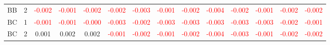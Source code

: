 \begin{table}[!htb]
{\begin{tabular}{llcccccccccccc}
BB & 2 & \textcolor{red}{-0.002} & \textcolor{red}{-0.001} & \textcolor{red}{-0.002} & \textcolor{red}{-0.002} & \textcolor{red}{-0.003} & \textcolor{red}{-0.001} & \textcolor{red}{-0.002} & \textcolor{red}{-0.004} & \textcolor{red}{-0.002} & \textcolor{red}{-0.001} & \textcolor{red}{-0.002} & \textcolor{red}{-0.002}\\
BC & 1 & \textcolor{red}{-0.001} & \textcolor{red}{-0.001} & \textcolor{red}{-0.000} & \textcolor{red}{-0.003} & \textcolor{red}{-0.002} & \textcolor{red}{-0.003} & \textcolor{red}{-0.003} & \textcolor{red}{-0.003} & \textcolor{red}{-0.003} & \textcolor{red}{-0.003} & \textcolor{red}{-0.002} & \textcolor{red}{-0.001}\\
BC & 2 & 0.001 & 0.002 & 0.002 & \textcolor{red}{-0.001} & \textcolor{red}{-0.002} & \textcolor{red}{-0.001} & \textcolor{red}{-0.002} & \textcolor{red}{-0.004} & \textcolor{red}{-0.003} & \textcolor{red}{-0.001} & \textcolor{red}{-0.002} & \textcolor{red}{-0.002}\\
\hline
    \end{tabular}%
    }
\end{table}

